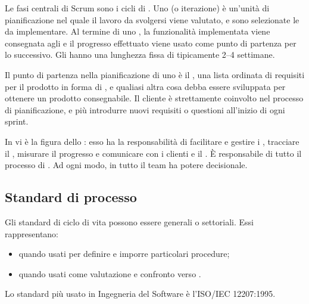 Le fasi centrali di Scrum sono i cicli di . Uno  (o iterazione) è un'unità di pianificazione nel quale il lavoro da svolgersi viene valutato, e sono selezionate le  da implementare. Al termine di uno , la funzionalità implementata viene consegnata agli  e il progresso effettuato viene usato come punto di partenza per lo  successivo. Gli  hanno una lunghezza fissa di tipicamente 2--4 settimane.

Il punto di partenza nella pianificazione di uno  è il , una lista ordinata di requisiti per il prodotto in forma di ,  e qualiasi altra cosa debba essere sviluppata per ottenere un prodotto consegnabile. Il cliente è strettamente coinvolto nel processo di pianificazione, e più introdurre nuovi requisiti o questioni all'inizio di ogni sprint.

In  vi è la figura dello : esso ha la responsabilità di facilitare e gestire i , tracciare il , misurare il progresso e comunicare con i clienti e il . È responsabile di tutto il processo di . Ad ogni modo, in  tutto il team ha potere decisionale.

\subsection{Standard di processo}
Gli standard di ciclo di vita possono essere generali o settoriali. Essi rappresentano:

\begin{itemize}
	\item {} quando usati per definire e imporre particolari procedure;
	\item {} quando usati come valutazione e confronto verso .
\end{itemize}

Lo standard più usato in Ingegneria del Software è l'ISO/IEC 12207:1995.

